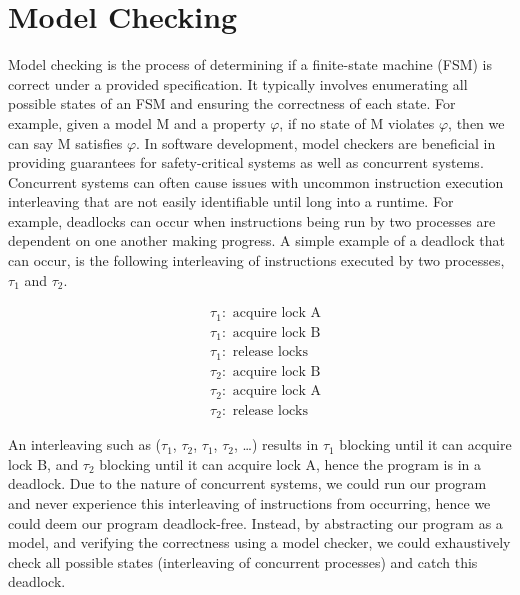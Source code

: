 \section{Model Checking} \label{sec:model_checking}
Model checking is the process of determining if a finite-state machine (FSM) is correct under a provided specification. It typically involves enumerating all possible states of an FSM and ensuring the correctness of each state. For example, given a model M and a property $\varphi$, if no state of M violates $\varphi$, then we can say M satisfies $\varphi$. In software development, model checkers are beneficial in providing guarantees for safety-critical systems as well as concurrent systems. Concurrent systems can often cause issues with uncommon instruction execution interleaving that are not easily identifiable until long into a runtime. For example, deadlocks can occur when instructions being run by two processes are dependent on one another making progress. A simple example of a deadlock that can occur, is the following interleaving of instructions executed by two processes, $\tau_1$ and $\tau_2$. 
\begin{multicols}{2}
    \[
    \begin{aligned}
    & \tau_1: \text{ acquire lock A} \\
    & \tau_1: \text{ acquire lock B} \\
    & \tau_1: \text{ release locks}
    \end{aligned}
    \]
    \vline
    \[
    \begin{aligned}
    & \tau_2: \text{ acquire lock B} \\
    & \tau_2: \text{ acquire lock A} \\
    & \tau_2: \text{ release locks}
    \end{aligned}
    \]
    \end{multicols}
An interleaving such as ($\tau_1$, $\tau_2$, $\tau_1$, $\tau_2$, \dots) results in $\tau_1$ blocking until it can acquire lock B, and $\tau_2$ blocking until it can acquire lock A, hence the program is in a deadlock. Due to the nature of concurrent systems, we could run our program and never experience this interleaving of instructions from occurring, hence we could deem our program deadlock-free. Instead, by abstracting our program as a model, and verifying the correctness using a model checker, we could exhaustively check all possible states (interleaving of concurrent processes) and catch this deadlock. 
\\ \\
